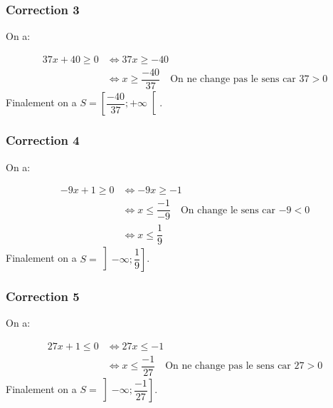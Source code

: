 \documentclass[15pt, mathserif]{beamer}
\begin{document}
\begin{frame}
\vspace{-10mm}
	\frametitle{Correction 3}
On a:

\begin{align*}
	37x+40\geq 0 & \Leftrightarrow 37x\geq-40\\
	 & \Leftrightarrow x\geq\dfrac{-40}{37} \quad \text{On ne change pas le sens car $37>0$}
\end{align*}Finalement on a $S = \left[\dfrac{-40}{37};+\infty\right[$.\end{frame}


\begin{frame}
\vspace{-10mm}
	\frametitle{Correction 4}
On a:

\begin{align*}
	-9x+1\geq 0 & \Leftrightarrow -9x\geq-1\\
	 & \Leftrightarrow x\leq\dfrac{-1}{-9} \quad \text{On change le sens car $-9<0$}\\
	 & \Leftrightarrow x\leq\dfrac{1}{9}
\end{align*}Finalement on a $S = \left]-\infty;\dfrac{1}{9}\right]$.\end{frame}


\begin{frame}
\vspace{-10mm}
	\frametitle{Correction 5}
On a:

\begin{align*}
	27x+1\leq 0 & \Leftrightarrow 27x\leq-1\\
	 & \Leftrightarrow x\leq\dfrac{-1}{27} \quad \text{On ne change pas le sens car $27>0$}
\end{align*}Finalement on a $S = \left]-\infty;\dfrac{-1}{27}\right]$.\end{frame}
\end{document}
